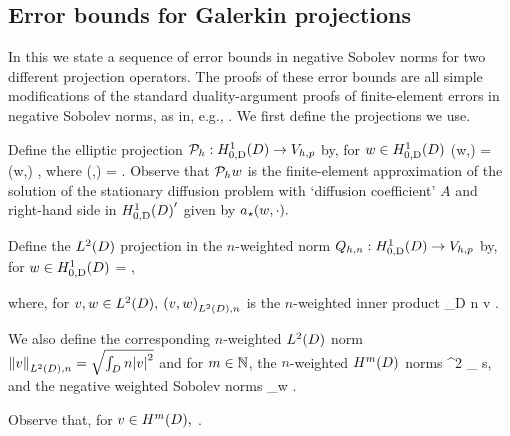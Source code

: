 \subsection{Error bounds for Galerkin projections}\label{sec:errgalerkin}
In this  we state a sequence of error bounds in negative Sobolev norms for two different projection operators. The proofs of these error bounds are all simple modifications of the standard duality-argument proofs of finite-element errors in negative Sobolev norms, as in, e.g., \cite[Theorem 5.8.3]{BrSc:08}.
We first define the projections we use.

Define the elliptic projection $\Ph:\HozDD\rightarrow\Vhp$ by, for $w \in \HozDD$
\beq\label{eq:epdef}
\aep(\Ph w,\vh) = \aep(w,\vh) \tforall \vh \in \Vhp,
  \eeq
  where
  \beq\label{eq:aepdef}
  \aep(\vo,\vt) = \IPLtD{\grad \vo}{\grad \vt}.
  \eeq
  Observe that $\mathcal P_{h} w$ is the finite-element approximation of the solution of the stationary diffusion problem with `diffusion coefficient' $A$ and right-hand side in $\HozDD'$ given by $a_{\star}(w,\cdot).$

Define the $\LtD$ projection in the $n$-weighted norm $\Qhn:\HozDD\rightarrow \Vhp$ by, for $w \in \HozDD$
\beqs
{} =  \tforall \vh \in \Vhp,
\eeqs

where, for $v,w \in \LtD,$ $\IPLtDn{v}{w}$ is the $n$-weighted inner product
\beqs
{} \de \int_{D} n v \wbar.
\eeqs

We also define the corresponding $n$-weighted $\LtD$ norm $\NLtDn{v} = \sqrt{\int_{D} n \abs{v}^2}$ and for $m \in \mathbb N$, the $n$-weighted $\HmD$ norms
\beqs
{}^2 \de \sum_{\alpha \st \abs{\alpha} \leq s},
\eeqs
and the negative weighted Sobolev norms
\beq\label{eq:negweightnorm}
 \de \sup_{w \in \HmD} .
\eeq

Observe that, for $v \in \HmD,$
\beq\label{eq:nconv}
\nmin{} \leq {} \leq {} .
\eeq

